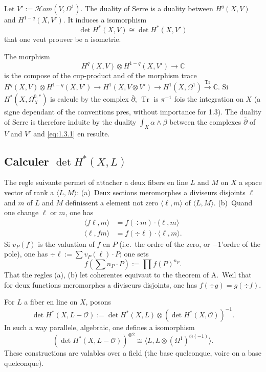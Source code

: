 \documentclass[12pt,a4paper]{article}
\theoremstyle{plain}
\theoremstyle{definition}
\DeclareMathOperator{\Tr}{Tr}
\newcommand{\CC}{\mathbb{C}}
\newcommand{\Oo}{\mathscr{O}}
\begin{document}
Let $V' := \mathscr{H}om(V, \Omega^1)$. The duality of Serre is a duality between $H^q(X,V)$
and $H^{1-q}(X,V')$. It induces a isomorphism
\begin{equation}\label{eq:1.3.1}
\det H^*(X,V) \cong \det H^*(X,V')
\end{equation}
that one veut prouver be a isometrie.

The morphism
\[
H^q(X,V) \otimes H^{1-q}(X,V') \longrightarrow \CC
\]
is the compose of the cup-product and of the morphism trace $H^q(X,V) \otimes H^{1-q}(X,V') \to
H^1(X, V \otimes V') \to H^1(X, \Omega^1) \xrightarrow{\Tr} \CC$. Si $H^*(X, \Omega^{0,*}_X)$ is calcule by the complex
$\bar\partial$, $\Tr$ is $\pi^{-1}$ fois the integration on $X$ (a signe dependant of the conventions
pres, without importance for 1.3). The duality of Serre is therefore induite by the
duality $\int_X \alpha \wedge \beta$ between the complexes $\bar\partial$ of $V$ and $V'$ and \eqref{eq:1.3.1} en resulte.

\subsection{Calculer $\det H^*(X,L)$}

The regle suivante permet of attacher a deux fibers en line $L$ and $M$ on
$X$ a space vector of rank a $\langle L, M \rangle$: (a)~Deux sections meromorphes a
diviseurs disjoints $\ell$ and $m$ of $L$ and $M$ definissent a element not zero
$\langle \ell, m \rangle$ of $\langle L, M \rangle$. (b)~Quand one change $\ell$ or $m$, one has
\begin{equation}\label{eq:1.4.1}
\begin{aligned}
\langle f\ell, m \rangle &= f(\div m) \cdot \langle \ell, m \rangle \\
\langle \ell, fm \rangle &= f(\div \ell) \cdot \langle \ell, m \rangle .
\end{aligned}
\end{equation}
Si $v_P(f)$ is the valuation of $f$ en $P$ (i.e.\ the ordre of the zero, or $-1$'ordre of the
pole), one has $\div \ell := \sum v_P(\ell) \cdot P$; one sets
\[
f(\sum n_P \cdot P) := \prod f(P)^{n_P} .
\]
That the regles (a), (b) let coherentes equivaut to the theorem of A.~Weil that for
deux functions meromorphes a diviseurs disjoints, one has $f(\div g) = g(\div f)$.

For $L$ a fiber en line on $X$, posons
\[
\det H^*(X, L - \Oo) := \det H^*(X,L) \otimes (\det H^*(X,\Oo))^{-1} .
\]
In such a way parallele, algebraic, one defines a isomorphism
\begin{equation}\label{eq:1.4.2}
(\det H^*(X, L - \Oo))^{\otimes 2} \cong \langle L, L \otimes (\Omega^1)^{\otimes(-1)} \rangle .
\end{equation}
These constructions are valables over a field (the base quelconque, voire on
a base quelconque).
\end{document}
